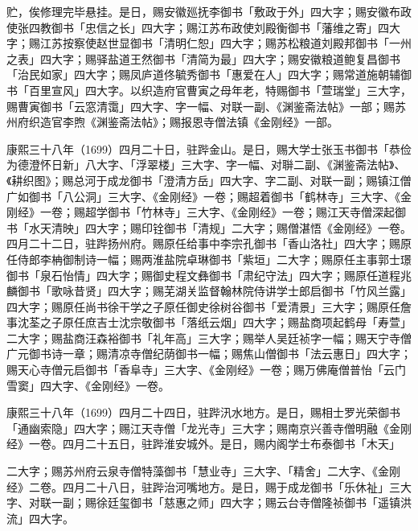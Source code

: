 
\noindent 贮，俟修理完毕悬挂。是日，赐安徽廵抚李御书「敷政于外」四大字；赐安徽布政使张四教御书「忠信之长」四大字；赐江苏布政使刘殿衡御书「藩维之寄」四大字；赐江苏按察使赵世显御书「清明仁恕」四大字；赐苏松粮道刘殿邦御书「一州之表」四大字；赐驿盐道王然御书「清简为最」四大字；赐安徽粮道鲍复昌御书「治民如家」四大字；赐凤庐道佟毓秀御书「惠爱在人」四大字；赐常道施朝辅御书「百里宣风」四大字。以织造府官曹寅之母年老，特赐御书「萱瑞堂」三大字，赐曹寅御书「云窓清霭」四大字、字一幅、对联一副、《渊鉴斋法帖》一部；赐苏州府织造官李煦《渊鉴斋法帖》；赐报恩寺僧法镇《金刚经》一部。

康熙三十八年（1699）四月二十日，驻跸金山。是日，赐大学士张玉书御书「恭俭为德澄怀日新」八大字、「浮翠楼」三大字、字一幅、对聨二副、《渊鉴斋法帖》、《耕织图》；赐总河于成龙御书「澄清方岳」四大字、字二副、对联一副；赐镇江僧广如御书「八公洞」三大字、《金刚经》一卷；赐超着御书「鹤林寺」三大字、《金刚经》一卷；赐超学御书「竹林寺」三大字、《金刚经》一卷；赐江天寺僧深起御书「水天清映」四大字；赐印铨御书「清规」二大字；赐僧湛悟《金刚经》一卷。四月二十二日，驻跸扬州府。赐原任给事中李宗孔御书「香山洛社」四大字；赐原任侍郎李柟御制诗一幅；赐两淮盐院卓琳御书「紫垣」二大字；赐原任主事郭士璟御书「泉石怡情」四大字；赐御史程文彝御书「肃纪守法」四大字；赐原任道程兆麟御书「歌咏昔贤」四大字；赐芜湖关监督翰林院侍讲学士郎启御书「竹风兰露」四大字；赐原任尚书徐干学之子原任御史徐树谷御书「爱清景」三大字；赐原任詹事沈荃之子原任庶吉士沈宗敬御书「落纸云烟」四大字；赐盐商项起鹤母「寿萱」二大字；赐盐商汪森裕御书「礼年高」三大字；赐举人吴廷祯字一幅；赐天宁寺僧广元御书诗一章；赐清凉寺僧纪荫御书一幅；赐焦山僧御书「法云惠日」四大字；赐天心寺僧元启御书「香阜寺」三大字、《金刚经》一卷；赐万佛庵僧普怡「云门雪窦」四大字、《金刚经》一卷。

康熙三十八年（1699）四月二十四日，驻跸汛水地方。是日，赐相士罗光荣御书「通幽索隐」四大字；赐江天寺僧「龙光寺」三大字；赐南京兴善寺僧明融《金刚经》一卷。四月二十五日，驻跸淮安城外。是日，赐内阁学士布泰御书「木天」


\noindent 二大字；赐苏州府云泉寺僧特藻御书「慧业寺」三大字、「精舍」二大字、《金刚经》二卷。四月二十八日，驻跸治河嘴地方。是日，赐于成龙御书「乐休祉」三大字、对联一副；赐徐廷玺御书「慈惠之师」四大字；赐云台寺僧隆祯御书「遥镇洪流」四大字。

